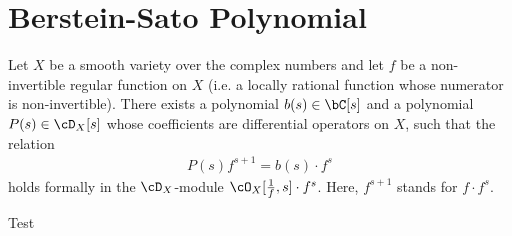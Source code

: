 \section{Berstein-Sato Polynomial}
\begin{thm}\label{thm:b-function-theorem}
	Let $X$ be a smooth variety over the complex numbers and let $f$ be a non-invertible regular function on $X$ (i.e. a locally rational function whose numerator is non-invertible). There exists a polynomial $b(s) \in \bC[s]$ and a polynomial $P(s) \in \cD_X[s]$ whose coefficients are differential operators on $X$, such that the relation
	\begin{align*}
		P(s)f^{s+1} = b(s)\cdot f^s
	\end{align*}
	holds formally in the $\cD_X$-module $\cO_X[\frac{1}{f},s] \cdot f^s$. Here, $f^{s+1}$ stands for $f\cdot f^s$.
\end{thm}
Test
\newpage
\printbibliography

